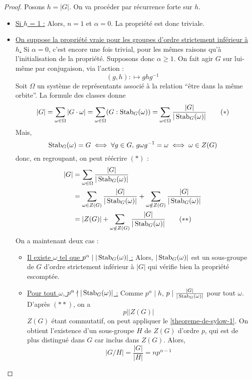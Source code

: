   \begin{proof}
    Posons $h = \vert G \vert$. On va procéder par récurrence forte sur $h$.
    \begin{itemize}
      \item \underline{Si $h$ = 1 :} Alors, $n = 1$ et $\alpha = 0$. La propriété est donc triviale.
      \item \underline{On suppose la propriété vraie pour les groupes d'ordre strictement inférieur à $h$.} Si $\alpha = 0$, c'est encore une fois trivial, pour les mêmes raisons qu'à l'initialisation de la propriété. Supposons donc $\alpha \geq 1$. On fait agir $G$ sur lui-même par conjugaison, via l'action :
      \[ (g,h) : \mapsto ghg^{-1} \]
      Soit $\Omega$ un système de représentants associé à la relation ``être dans la même orbite''. La formule des classes donne
      \[ |G| = \sum_{\omega \in \Omega} |G \cdot \omega| = \sum_{\omega \in \Omega} (G : \operatorname{Stab}_G(\omega)) = \sum_{\omega \in \Omega} \frac{|G|}{|\operatorname{Stab}_G(\omega)|} \tag{$*$} \]
      Mais,
      \[ \operatorname{Stab}_G(\omega) = G \iff \forall g \in G, \, g \omega g^{-1} = \omega \iff \omega \in Z(G) \]
      donc, en regroupant, on peut réécrire $(*)$ :
      \begin{align*}
        |G| &= \sum_{\omega \in \Omega} \frac{|G|}{|\operatorname{Stab}_G(\omega)|} \\
        & = \sum_{\omega \in Z(G)} \frac{|G|}{|\operatorname{Stab}_G(\omega)|} + \sum_{\omega \notin Z(G)} \frac{|G|}{|\operatorname{Stab}_G(\omega)|} \\
        &= \vert Z(G) \vert + \sum_{\omega \notin Z(G)} \frac{|G|}{|\operatorname{Stab}_G(\omega)|} \tag{$**$}
      \end{align*}
      On a maintenant deux cas :
      \begin{itemize}
        \item \underline{Il existe $\omega$ tel que $p^\alpha \mid |\operatorname{Stab}_G(\omega)|$ :} Alors, $|\operatorname{Stab}_G(\omega)|$ est un sous-groupe de $G$ d'ordre strictement inférieur à $\vert G \vert$ qui vérifie bien la propriété escomptée.
        \item \underline{Pour tout $\omega$, $p^\alpha \nmid |\operatorname{Stab}_G(\omega)|$ :} Comme $p^\alpha \mid h$, $p \mid \frac{|G|}{|\operatorname{Stab}_G(\omega)|}$ pour tout $\omega$. D'après $(**)$, on a
        \[ p \mid \vert Z(G) \vert \]
        $Z(G)$ étant commutatif, on peut appliquer le \cref{theoreme-de-sylow-1}. On obtient l'existence d'un sous-groupe $H$ de $Z(G)$ d'ordre $p$, qui est de plus distingué dans $G$ car inclus dans $Z(G)$. Alors,
        \[ \vert G/H \vert = \frac{\vert G \vert}{\vert H \vert} = np^{\alpha - 1} \]

\end{itemize}
\end{itemize}
\end{proof}
